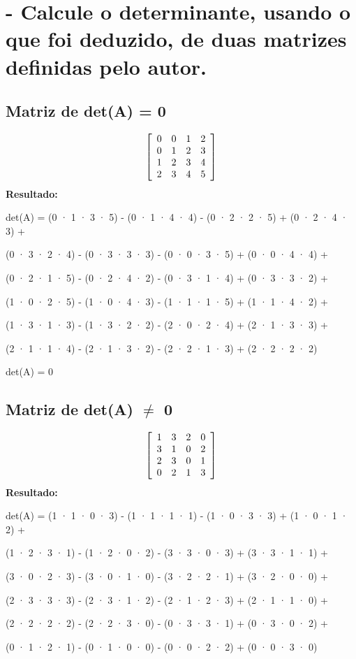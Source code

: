 \documentclass[a4paper, 12pt]{article}
\begin{document}
\section{- Calcule o determinante, usando o que foi deduzido, de duas matrizes definidas pelo autor.}

\subsection{Matriz de det(A) = 0}
$$\left[
\begin{array}{c c c c}
0&0&1&2\\
0&1&2&3\\
1&2&3&4\\ 2&3&4&5
\end{array}\right]
$$
\textbf{Resultado:}

\centerline{det(A) = (0 · 1 · 3 · 5) - (0 · 1 · 4 · 4) - (0 · 2 · 2 · 5) + (0 · 2 · 4 · 3) +}
\centerline{(0 · 3 · 2 · 4) - (0 · 3 · 3 · 3) - (0 · 0 · 3 · 5) + (0 · 0 · 4 · 4) +}
\centerline{(0 · 2 · 1 · 5) - (0 · 2 · 4 · 2) - (0 · 3 · 1 · 4) + (0 · 3 · 3 · 2) +}
\centerline{(1 · 0 · 2 · 5) - (1 · 0 · 4 · 3) - (1 · 1 · 1 · 5) + (1 · 1 · 4 · 2) +}
\centerline{(1 · 3 · 1 · 3) - (1 · 3 · 2 · 2) - (2 · 0 · 2 · 4) + (2 · 1 · 3 · 3) +}
\centerline{(2 · 1 · 1 · 4) - (2 · 1 · 3 · 2) - (2 · 2 · 1 · 3) + (2 · 2 · 2 · 2)}\vspace{1cm}

\centerline{det(A) = 0}


\subsection{Matriz de det(A) $\neq$ 0}
$$\left[
\begin{array}{c c c c}
1&3&2&0\\
3&1&0&2\\
2&3&0&1\\ 0&2&1&3
\end{array}\right]
$$
\textbf{Resultado:}

\centerline{det(A) = (1 · 1 · 0 · 3) - (1 · 1 · 1 · 1) - (1 · 0 · 3 · 3) + (1 · 0 · 1 · 2) +}
\centerline{(1 · 2 · 3 · 1) - (1 · 2 · 0 · 2) - (3 · 3 · 0 · 3) + (3 · 3 · 1 · 1) +}
\centerline{(3 · 0 · 2 · 3) - (3 · 0 · 1 · 0) - (3 · 2 · 2 · 1) + (3 · 2 · 0 · 0) +}
\centerline{(2 · 3 · 3 · 3) - (2 · 3 · 1 · 2) - (2 · 1 · 2 · 3) + (2 · 1 · 1 · 0) +}
\centerline{(2 · 2 · 2 · 2) - (2 · 2 · 3 · 0) - (0 · 3 · 3 · 1) + (0 · 3 · 0 · 2) +}
\centerline{(0 · 1 · 2 · 1) - (0 · 1 · 0 · 0) - (0 · 0 · 2 · 2) + (0 · 0 · 3 · 0)}\vspace{1cm}
\end{document}
